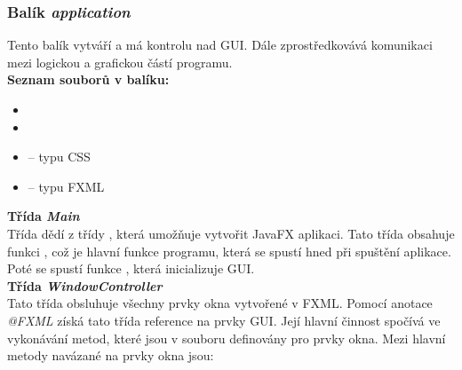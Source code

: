 \documentclass[
  biblatex=false,
  font=serif,
  glossaries=false,
  tables=false,
  theorems=false,
  index
]{kidiplom}
\begin{document}
\subsubsection{Balík \textit{application}}
\indent\indent Tento balík vytváří a má kontrolu nad GUI. Dále zprostředkovává komunikaci mezi logickou a grafickou částí programu. \\

\noindent \textbf{Seznam souborů v balíku:}
\begin{itemize}
\item {}
\item {}
\item {} -- typu CSS
\item {} -- typu FXML
\end{itemize}

\smallskip
\noindent \textbf{Třída \textit{Main}}\\
\indent Třída dědí z třídy , která umožňuje vytvořit JavaFX aplikaci. Tato třída obsahuje funkci , což je hlavní funkce programu, která se spustí hned při spuštění aplikace. Poté se spustí funkce , která inicializuje GUI.\\

\noindent \textbf{Třída \textit{WindowController}}\\
\indent Tato třída obsluhuje všechny prvky okna vytvořené v FXML. Pomocí anotace \textit{@FXML} získá tato třída reference na prvky GUI. Její hlavní činnost spočívá ve vykonávání metod, které jsou  v souboru  definovány pro prvky okna. Mezi hlavní metody navázané na prvky okna jsou: 
\end{document}
